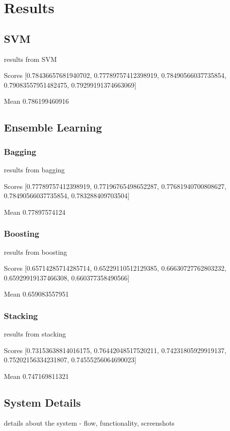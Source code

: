 \chapter{Results}
\label{chapter:Results}

\section{SVM}
results from SVM

Scores [0.78436657681940702, 0.77789757412398919, 0.78490566037735854, 0.79083557951482475, 0.79299191374663069]

Mean 0.786199460916

\section{Ensemble Learning}

\subsection{Bagging}
results from bagging

Scores [0.77789757412398919, 0.77196765498652287, 0.77681940700808627, 0.78490566037735854, 0.783288409703504]

Mean 0.77897574124

\subsection{Boosting}
results from boosting

Scores [0.65714285714285714, 0.65229110512129385, 0.66630727762803232, 0.65929919137466308, 0.660377358490566]

Mean 0.659083557951

\subsection{Stacking}
results from stacking

Scores [0.73153638814016175, 0.76442048517520211, 0.74231805929919137, 0.75202156334231807, 0.74555256064690023]

Mean 0.747169811321

\section{System Details}
details about the system - flow, functionality, screenshots
